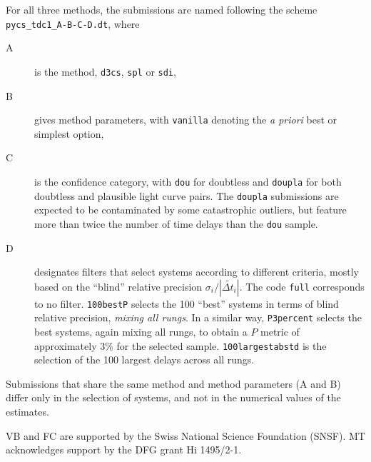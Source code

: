 \documentclass[traditabstract]{aa}
\begin{document}
For all three methods, the submissions are named following the
scheme {\tt pycs\_tdc1\_A-B-C-D.dt}, where
\begin{description}
\item[A] is the method, {\tt d3cs}, {\tt spl} or {\tt sdi},
\item[B] gives method parameters, with {\tt vanilla} denoting the \emph{a priori} best or simplest option,
\item[C] is the confidence category, with {\tt dou} for doubtless and {\tt doupla} for both doubtless and plausible light curve pairs. The {\tt doupla} submissions are expected to be contaminated by some catastrophic outliers, but feature more than twice the number of time delays than the {\tt dou} sample.
\item[D] designates filters that select systems according to different criteria, mostly based on the
``blind'' relative precision $\sigma_i / |\widetilde{\Delta t_i}|$. The code {\tt full} corresponds to no filter. {\tt 100bestP} selects the 100 ``best'' systems in terms of blind relative precision, \emph{mixing all rungs}. In a similar way, {\tt P3percent} selects the best systems, again mixing all rungs, to obtain a $P$ metric of approximately 3\% for the selected sample. {\tt 100largestabstd} is the selection of the 100 largest delays across all rungs.
\end{description}
Submissions that share the same method and method parameters (A and B) differ only in the selection of systems, and not in the numerical values of the estimates.









\begin{acknowledgements}
VB and FC are supported by the Swiss National Science Foundation (SNSF). MT acknowledges support by the DFG grant Hi 1495/2-1.
\end{acknowledgements}





\end{document}
